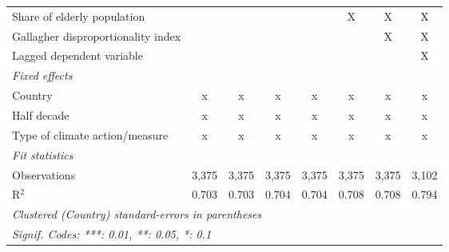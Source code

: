 \begin{tabular}{lccccccc}
   Share of elderly population                                         &                &               &              &               & X              & X              & X\\  
   Gallagher disproportionality index                                  &                &               &              &               &                & X              & X\\  
   Lagged dependent variable                                           &                &               &              &               &                &                & X\\  
   \emph{Fixed effects}\\
   Country                                                             & x              & x             & x            & x             & x              & x              & x\\  
   Half decade                                                         & x              & x             & x            & x             & x              & x              & x\\  
   Type of climate action/measure                                      & x              & x             & x            & x             & x              & x              & x\\  
   \midrule \emph{Fit statistics}\\
   Observations                                                        & 3,375          & 3,375         & 3,375        & 3,375         & 3,375          & 3,375          & 3,102\\  
   R$^2$                                                               & 0.703          & 0.703         & 0.704        & 0.704         & 0.708          & 0.708          & 0.794\\  
   \midrule
   \multicolumn{8}{l}{\emph{Clustered (Country) standard-errors in parentheses}}\\
   \multicolumn{8}{l}{\emph{Signif. Codes: ***: 0.01, **: 0.05, *: 0.1}}\\
\end{tabular}
\par\endgroup


